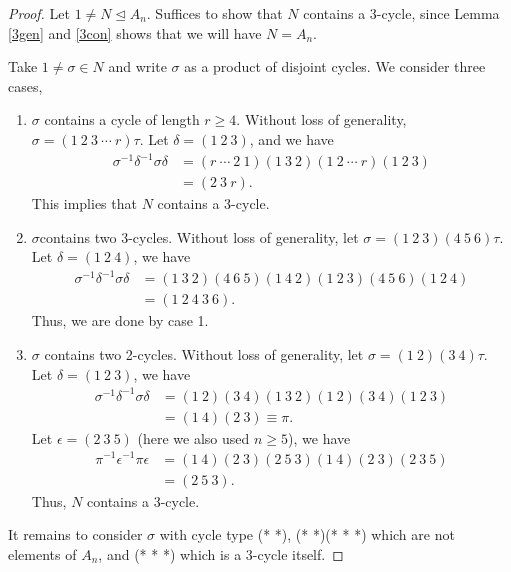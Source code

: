 \begin{proof}
    Let \(1\neq N \trianglelefteq A_n\). Suffices to show that \(N\) contains a 3-cycle, since Lemma \eqref{3gen} and \eqref{3con} shows that we will have \(N=A_n\).

    Take \(1\neq \sigma\in N\) and write \(\sigma\) as a product of disjoint cycles. We consider three cases,
    \begin{enumerate}
        \item \(\sigma\) contains a cycle of length \(r \geq 4\). Without loss of generality, \(\sigma = (1~2~3~\cdots~r)\tau\). Let \(\delta = (1~2~3)\), and we have
        \begin{align*}
            \sigma^{-1}\delta^{-1}\sigma\delta &= (r~\cdots~2~1)(1~3~2)(1~2~\cdots~r)(1~2~3)\\
            &=(2~3~r).
        \end{align*}
        This implies that \(N\) contains a 3-cycle.
        \item \(\sigma\)contains two 3-cycles. Without loss of generality, let \(\sigma=(1~2~3)(4~5~6)\tau\). Let \(\delta = (1~2~4)\), we have
        \begin{align*}
            \sigma^{-1}\delta^{-1}\sigma\delta&=(1~3~2)(4~6~5)(1~4~2)(1~2~3)(4~5~6)(1~2~4)\\
            &=(1~2~4~3~6).
        \end{align*}
        Thus, we are done by case 1.
        \item \(\sigma\) contains two 2-cycles. Without loss of generality, let \(\sigma = (1~2)(3~4)\tau\). Let \(\delta = (1~2~3)\), we have
        \begin{align*}
            \sigma^{-1}\delta^{-1}\sigma\delta&=(1~2)(3~4)(1~3~2)(1~2)(3~4)(1~2~3)\\
            &=(1~4)(2~3)\equiv \pi.
        \end{align*}
        Let \(\epsilon = (2~3~5)\) (here we also used \(n \geq 5\)), we have
        \begin{align*}
            \pi^{-1}\epsilon^{-1}\pi\epsilon&=(1~4)(2~3)(2~5~3)(1~4)(2~3)(2~3~5)\\
            &=(2~5~3).
        \end{align*}
        Thus, \(N\) contains a 3-cycle.
    \end{enumerate}
    It remains to consider \(\sigma\) with cycle type (* *), (* *)(* * *) which are not elements of \(A_n\), and (* * *) which is a 3-cycle itself.
\end{proof}